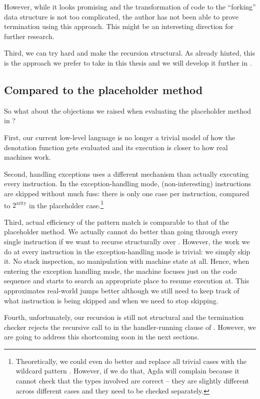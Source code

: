 However, while it looks promising and the transformation of code to the
``forking'' data structure is not too complicated, the author has not been able
to prove termination using this approach. This might be an interesting direction
for further research.

Third, we can try hard and make the recursion structural. As already hinted,
this is the approach we prefer to take in this thesis and we will develop it
further in .

\subsection{Compared to the placeholder method}

So what about the objections we raised when evaluating the placeholder method
in ?

First, our current low-level language is no longer a trivial model of how the
denotation function  gets evaluated and its execution is closer
to how real machines work.

Second, handling exceptions uses a different mechanism than actually executing
every instruction. In the exception-handling mode, (non-interesting)
instructions are skipped without much fuss: there is only one case per
instruction, compared to $2^\mathrm{arity}$ in the placeholder
case.\footnote{Theoretically, we could even do better and replace all trivial
cases with the wildcard pattern \ident{\_}. However, if we do that, Agda will
complain because it cannot check that the types involved are correct
-- they are slightly different across different cases and they need to be
checked separately.}

Third, actual efficiency of the pattern match is comparable to that of the
placeholder method. We actually cannot do better than going through every
single instruction if we want to recurse structurally over .
However, the work we do at every instruction in the exception-handling mode is
trivial: we simply skip it. No stack inspection, no manipulation with machine
state at all.  Hence, when entering the exception handling mode, the machine
focuses just on the code sequence and starts to search an appropriate place to
resume execution at. This approximates real-world jumps better although we still
need to keep track of what instruction is being skipped and when we need to
stop skipping.

Fourth, unfortunately, our recursion is still not structural and the
termination checker rejects the recursive call to  in the
handler-running clause of . However, we are going to address
this shortcoming soon in the next sections.

